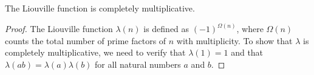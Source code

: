 \begin{theorem}
\label{isCompletelyMultiplicative_liouville}
\leanok
The Liouville function is completely multiplicative.
\end{theorem}
\begin{proof}
The Liouville function $\lambda(n)$ is defined as $(-1)^{\Omega(n)}$, where $\Omega(n)$ counts the total number of prime factors of $n$ with multiplicity. To show that $\lambda$ is completely multiplicative, we need to verify that $\lambda(1) = 1$ and that $\lambda(ab) = \lambda(a)\lambda(b)$ for all natural numbers $a$ and $b$.
\end{proof}
